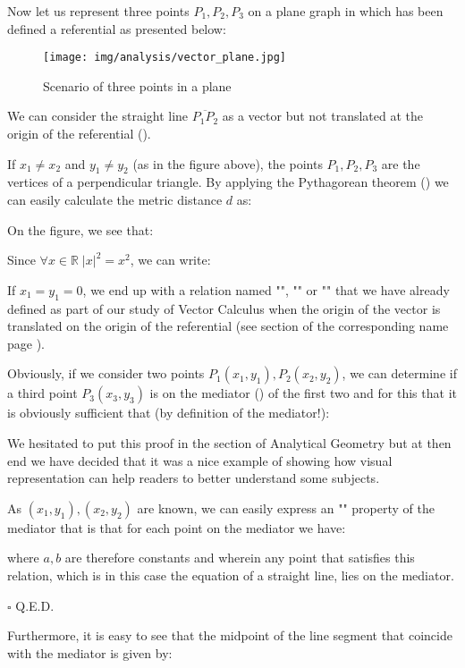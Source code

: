 Now let us represent three points $P_1,P_2,P_3$ on a plane graph in which has been defined a referential as presented below:

\begin{figure}[H]
\centering
\texttt{[image: img/analysis/vector\_plane.jpg]}
\caption[]{Scenario of three points in a plane}
\end{figure}

We can consider the straight line $\overline{P_1P_2}$ as a vector but not translated at the origin of the referential ().

If $x_1\neq x_2$ and $y_1\neq y_2$ (as in the figure above), the points $P_1,P_2,P_3$ are the vertices of a perpendicular triangle. By applying the Pythagorean theorem () we can easily calculate the metric distance $d$ as:
	
	On the figure, we see that:
	
	Since $\forall x \in \mathbb{R} \; \vert x \vert ^2 =x^2$, we can write:
	
	If $x_1=y_1=0$, we end up with a relation named "", "" or "" that we have already defined as part of our study of Vector Calculus when the origin of the vector is translated on the origin of the referential (see section of the corresponding name page \pageref{vector norm}).
	
	\begin{theorem}
	Obviously, if we consider two points $P_1(x_1,y_1),P_2(x_2,y_2)$, we can determine if a third point $P_3(x_3,y_3)$ is on the mediator () of the first two and for this that it is obviously sufficient that (by definition of the mediator!):
	
	\end{theorem}
	\begin{tcolorbox}[title=Remark,colframe=black,arc=10pt]
	We hesitated to put this proof in the section of Analytical Geometry but at then end we have decided that it was a nice example of showing how visual representation can help readers to better understand some subjects.
	\end{tcolorbox}	
	\begin{dem}
	As $(x_1,y_1),(x_2,y_2)$ are known, we can easily express an "" property of the mediator that is that for each point on the mediator we have:
	
	where $a, b$ are therefore constants and wherein any point that satisfies this relation, which is in this case the equation of a straight line, lies on the mediator.
	\begin{flushright}
		$\square$  Q.E.D.
	\end{flushright}
	\end{dem}
	Furthermore, it is easy to see that the midpoint of the line segment that coincide with the mediator is given by:
	
